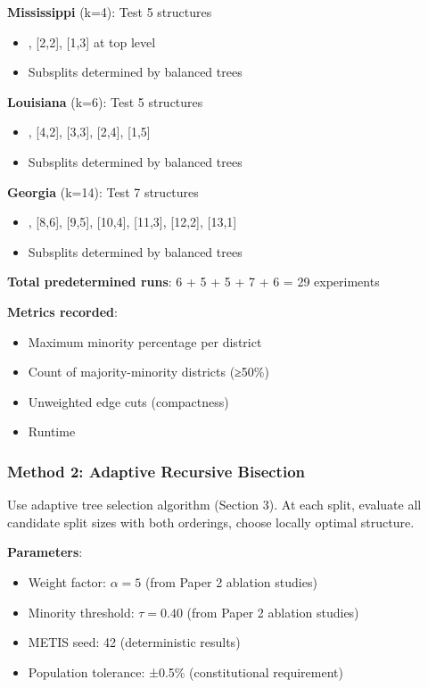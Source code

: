 \textbf{Mississippi} (k=4): Test 5 structures
\begin{itemize}
\item [3,1], [2,2], [1,3] at top level
\item Subsplits determined by balanced trees
\end{itemize}

\textbf{Louisiana} (k=6): Test 5 structures
\begin{itemize}
\item [5,1], [4,2], [3,3], [2,4], [1,5]
\item Subsplits determined by balanced trees
\end{itemize}

\textbf{Georgia} (k=14): Test 7 structures
\begin{itemize}
\item [7,7], [8,6], [9,5], [10,4], [11,3], [12,2], [13,1]
\item Subsplits determined by balanced trees
\end{itemize}

\textbf{Total predetermined runs}: 6 + 5 + 5 + 7 + 6 = 29 experiments

\textbf{Metrics recorded}:
\begin{itemize}
\item Maximum minority percentage per district
\item Count of majority-minority districts (≥50\%)
\item Unweighted edge cuts (compactness)
\item Runtime
\end{itemize}

\subsubsection{Method 2: Adaptive Recursive Bisection}

Use adaptive tree selection algorithm (Section 3). At each split, evaluate all candidate split sizes with both orderings, choose locally optimal structure.

\textbf{Parameters}:
\begin{itemize}
\item Weight factor: $\alpha = 5$ (from Paper 2 ablation studies)
\item Minority threshold: $\tau = 0.40$ (from Paper 2 ablation studies)
\item METIS seed: 42 (deterministic results)
\item Population tolerance: ±0.5\% (constitutional requirement)
\end{itemize}

